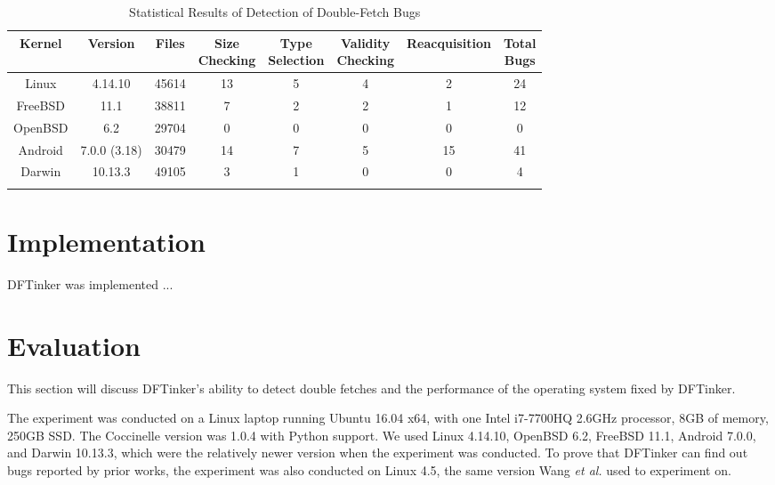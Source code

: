 \documentclass[10pt]{llncs}
\begin{document}
\begin{table}[t]
  \centering
  \caption{Statistical Results of Detection of Double-Fetch Bugs}
  \begin{tabular}{cccccccc}
    \hline
    Kernel & Version & Files & \makecell{Size \\ Checking} & \makecell{Type \\ Selection} & \makecell{Validity \\ Checking} & Reacquisition & \makecell{Total \\ Bugs}\\    
    \hline
    Linux & 4.14.10 & 45614 & 13 & 5 & 4 & 2 & 24 \\
    FreeBSD & 11.1 & 38811 & 7 & 2 & 2 & 1 & 12 \\
    OpenBSD & 6.2 & 29704 & 0 & 0 & 0 & 0 & 0 \\
    Android & 7.0.0 (3.18) & 30479 & 14 & 7 & 5 & 15 & 41 \\
    Darwin & 10.13.3 & 49105 & 3 & 1 & 0 & 0 & 4 \\
    \hline
    \label{stat}
  \end{tabular}
\end{table}




\section{Implementation}%
\label{imple}
DFTinker was implemented ...



\section{Evaluation}%
\label{evalue}
This section will discuss DFTinker's ability to detect double fetches and the performance of the operating system fixed by DFTinker.

The experiment was conducted on a Linux laptop running Ubuntu 16.04 x64, with one Intel i7-7700HQ 2.6GHz processor, 8GB of memory, 250GB SSD. The Coccinelle version was 1.0.4 with Python support. We used Linux 4.14.10, OpenBSD 6.2, FreeBSD 11.1, Android 7.0.0, and Darwin 10.13.3, which were the relatively newer version when the experiment was conducted. To prove that DFTinker can find out bugs reported by prior works, the experiment was also conducted on Linux 4.5, the same version Wang \textit{et al.} used to experiment on.
\end{document}
